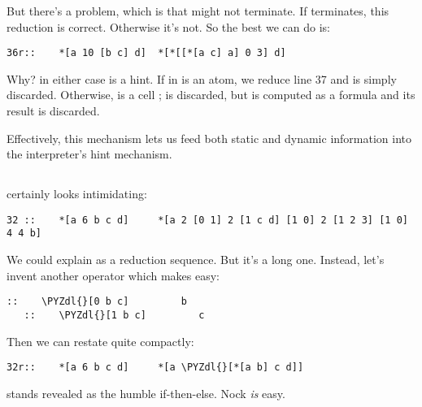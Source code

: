 But there's a problem, which is that  might not terminate.
If  terminates, this reduction is correct.  Otherwise it's not. 
So the best we can do is:

\begin{framed_shaded}
\begin{Verbatim}[fontsize=\relsize{-2.5},fontseries=b,commandchars=\\\{\}]
36r::    *[a 10 [b c] d]  *[*[[*[a c] a] 0 3] d]
\end{Verbatim}
\end{framed_shaded}
Why?   in either case is a hint.  If  in \kode{[10 x y]} is an
atom, we reduce line 37 and  is simply discarded.  Otherwise,
 is a cell \kode{[b c]};  is discarded, but  is computed as a
formula and its result is discarded.

Effectively, this mechanism lets us feed both static and dynamic
information into the interpreter's hint mechanism.

\subsection{}

 certainly looks intimidating:

\begin{framed_shaded}
\begin{Verbatim}[fontsize=\relsize{-2.5},fontseries=b,commandchars=\\\{\}]
32 ::    *[a 6 b c d]     *[a 2 [0 1] 2 [1 c d] [1 0] 2 [1 2 3] [1 0] 4 4 b]
\end{Verbatim}
\end{framed_shaded}
We could explain  as a reduction sequence.  But it's a long
one.  Instead, let's invent another operator which makes  easy:

\begin{framed_shaded}
\begin{Verbatim}[fontsize=\relsize{-2.5},fontseries=b,commandchars=\\\{\}]
   ::    \PYZdl{}[0 b c]         b
   ::    \PYZdl{}[1 b c]         c
\end{Verbatim}
\end{framed_shaded}
Then we can restate  quite compactly:

\begin{framed_shaded}
\begin{Verbatim}[fontsize=\relsize{-2.5},fontseries=b,commandchars=\\\{\}]
32r::    *[a 6 b c d]     *[a \PYZdl{}[*[a b] c d]]
\end{Verbatim}
\end{framed_shaded}
 stands revealed as the humble if-then-else.  Nock \emph{is} easy.

